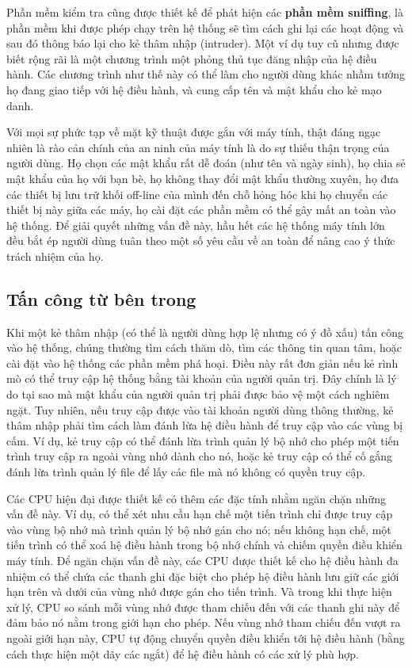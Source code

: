 Phần mềm kiểm tra cũng được thiết kế để phát hiện các \textbf{phần mềm sniffing}, là phần
mềm khi được phép chạy trên hệ thống sẽ tìm cách ghi lại các hoạt động và sau đó thông báo
lại cho kẻ thâm nhập (intruder). Một ví dụ tuy cũ nhưng được biết rộng rãi là một chương
trình một phỏng thủ tục đăng nhập của hệ điều hành. Các chương trình như thế này có thể
làm cho người dùng khác nhầm tưởng họ đang giao tiếp với hệ điều hành, và cung cấp tên và
mật khẩu cho kẻ mạo danh.

Với mọi sự phức tạp về mặt kỹ thuật được gắn với máy tính, thật đáng ngạc nhiên là rào cản
chính của an ninh của máy tính là do sự thiếu thận trọng của người dùng. Họ chọn các mật
khẩu rất dễ đoán (như tên và ngày sinh), họ chia sẻ mật khẩu của họ với bạn bè, họ không
thay đổi mật khẩu thường xuyên, họ đưa các thiết bị lưu trữ khối off-line của mình đến chỗ
hỏng hóc khi họ chuyển các thiết bị này giữa các máy, họ cài đặt các phần mềm có thể gây
mất an toàn vào hệ thống. Để giải quyết những vấn đề này, hầu hết các hệ thống máy tính
lớn đều bắt ép người dùng tuân theo một số yêu cầu về an toàn để nâng cao ý thức trách
nhiệm của họ.

\subsection*{Tấn công từ bên trong}
Khi một kẻ thâm nhập (có thể là người dùng hợp lệ nhưng có ý đồ xấu) tấn công vào hệ
thống, chúng thường tìm cách thăm dò, tìm các thông tin quan tâm, hoặc cài đặt vào hệ
thống các phần mềm phá hoại. Điều này rất đơn giản nếu kẻ rình mò có thể truy cập hệ thống
bằng tài khoản của người quản trị. Đây chính là lý do tại sao mà mật khẩu của người quản
trị phải được bảo vệ một cách nghiêm ngặt. Tuy nhiên, nếu truy cập được vào tài khoản
người dùng thông thường, kẻ thâm nhập phải tìm cách làm đánh lừa hệ điều hành để truy cập
vào các vùng bị cấm. Ví dụ, kẻ truy cập có thể đánh lừa trình quản lý bộ nhớ cho phép một
tiến trình truy cập ra ngoài vùng nhớ dành cho nó, hoặc kẻ truy cập có thể cố gắng đánh
lừa trình quản lý file để lấy các file mà nó không có quyền truy cập.


Các CPU hiện đại được thiết kế có thêm các đặc tính nhằm ngăn chặn những vấn đề này. Ví
dụ, có thể xét nhu cầu hạn chế một tiến trình chỉ được truy cập vào vùng bộ nhớ mà trình
quản lý bộ nhớ gán cho nó; nếu không hạn chế, một tiến trình có thể xoá hệ điều hành trong
bộ nhớ chính và chiếm quyền điều khiển máy tính. Để ngăn chặn vấn đề này, các CPU được
thiết kế cho hệ điều hành đa nhiệm có thể chứa các thanh ghi đặc biệt cho phép hệ điều
hành lưu giữ các giới hạn trên và dưới của vùng nhớ được gán cho tiến trình. Và trong khi
thực hiện xử lý, CPU so sánh mỗi vùng nhớ được tham chiếu đến với các thanh ghi này để đảm
bảo nó nằm trong giới hạn cho phép. Nếu vùng nhớ tham chiếu đến vượt ra ngoài giới hạn
này, CPU tự động chuyển quyền điều khiển tới hệ điều hành (bằng cách thực hiện một dãy các
ngắt) để hệ điều hành có các xử lý phù hợp.

